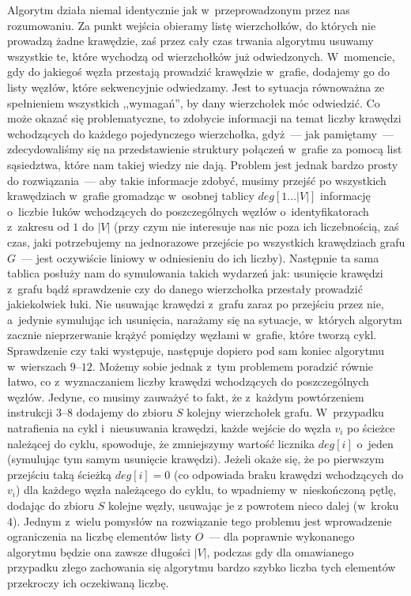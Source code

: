 Algorytm działa niemal identycznie jak w~przeprowadzonym przez nas rozumowaniu.
Za punkt wejścia obieramy listę wierzchołków, do których nie prowadzą żadne krawędzie, zaś przez cały czas trwania algorytmu usuwamy wszystkie te, które wychodzą od wierzchołków już odwiedzonych. W~momencie, gdy do jakiegoś węzła przestają prowadzić krawędzie w~grafie, dodajemy go do listy węzłów, które sekwencyjnie odwiedzamy.
Jest to sytuacja równoważna ze spełnieniem wszystkich ,,wymagań'', by dany wierzchołek móc odwiedzić.
Co może okazać się problematyczne, to zdobycie informacji na temat liczby krawędzi wchodzących do każdego pojedynczego wierzchołka, gdyż~--- jak pamiętamy~--- zdecydowaliśmy się na przedstawienie struktury połączeń w~grafie za pomocą list sąsiedztwa, które nam takiej wiedzy nie dają.
Problem jest jednak bardzo prosty do rozwiązania~--- aby takie informacje zdobyć, musimy przejść po wszystkich krawędziach w~grafie gromadząc w~osobnej tablicy $deg \left[1 \dots \left| V \right| \right]$ informację o~liczbie łuków wchodzących do poszczególnych węzłów o~identyfikatorach z~zakresu od $1$ do $\left| V \right|$ (przy czym nie interesuje nas nic poza ich liczebnością, zaś czas, jaki potrzebujemy na jednorazowe przejście po wszystkich krawędziach grafu $G$~--- jest oczywiście liniowy w odniesieniu do ich liczby).
Następnie ta sama tablica posłuży nam do symulowania takich wydarzeń jak: usunięcie krawędzi z~grafu bądź sprawdzenie czy do danego wierzchołka przestały prowadzić jakiekolwiek łuki.
Nie usuwając krawędzi z~grafu zaraz po przejściu przez nie, a~jedynie symulując ich usunięcia, narażamy się na sytuacje, w~których algorytm zacznie nieprzerwanie krążyć pomiędzy węzłami w~grafie, które tworzą cykl. Sprawdzenie czy taki występuje, następuje dopiero pod sam koniec algorytmu w~wierszach $9$--$12$.
Możemy sobie jednak z~tym problemem poradzić równie łatwo, co z~wyznaczaniem liczby krawędzi wchodzących do poszczególnych węzłów.
Jedyne, co musimy zauważyć to fakt, że z~każdym powtórzeniem instrukcji $3$--$8$ dodajemy do zbioru $S$ kolejny wierzchołek grafu.
W~przypadku natrafienia na cykl i~nieusuwania krawędzi, każde wejście do węzła $v_{i}$ po ścieżce należącej do cyklu, spowoduje, że zmniejszymy wartość licznika $deg \left[ i \right]$ o~jeden (symulując tym samym usunięcie krawędzi).
Jeżeli okaże się, że po pierwszym przejściu taką ścieżką $deg \left[ i \right] = 0$ (co odpowiada braku krawędzi wchodzących do $v_{i}$) dla każdego węzła należącego do cyklu, to wpadniemy w~nieskończoną pętlę, dodając do zbioru $S$ kolejne węzły, usuwając je z powrotem nieco dalej (w~kroku $4$).
Jednym z~wielu pomysłów na rozwiązanie tego problemu jest wprowadzenie ograniczenia na liczbę elementów listy $O$~--- dla poprawnie wykonanego algorytmu będzie ona zawsze długości $\left| V \right|$, podczas gdy dla omawianego przypadku złego zachowania się algorytmu bardzo szybko liczba tych elementów przekroczy ich oczekiwaną liczbę.

